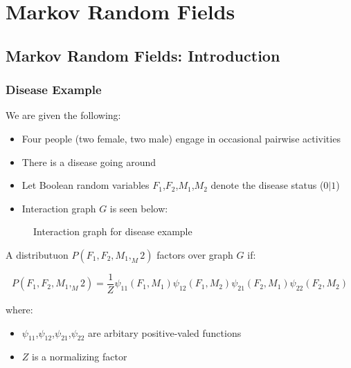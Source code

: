 \documentclass{article}
\begin{document}
\pagestyle{fancy}

\section{Markov Random Fields}
\subsection{Markov Random Fields: Introduction}
\subsubsection{Disease Example}
\begin{flushleft}
    We are given the following:
    \begin{itemize}
        \item Four people (two female, two male) engage in occasional pairwise activities
        \item There is a disease going around
        \item Let Boolean random variables $F_1$,$F_2$,$M_1$,$M_2$ denote the disease status ($0|1$)
        \item Interaction graph $G$ is seen below:
    \end{itemize}
\end{flushleft}
\begin{figure}[h!]
\centering
\caption{Interaction graph for disease example}
\label{fig:projection_x_on_u}
\end{figure}
\begin{flushleft}
    A distributuon $P(F_1,F_2,M_1,_M2)$ factors over graph $G$ if:
\end{flushleft}
$$
P(F_1,F_2,M_1,_M2) = \frac{1}{Z} \psi_{11}(F_1,M_1)\psi_{12}(F_1,M_2)\psi_{21}(F_2,M_1)\psi_{22}(F_2,M_2)
$$
\begin{flushleft}
    where:
    \begin{itemize}
        \item $\psi_{11}$,$\psi_{12}$,$\psi_{21}$,$\psi_{22}$ are arbitary positive-valed functions
        \item $Z$ is a normalizing factor
    \end{itemize}
\end{flushleft}
\end{document}
